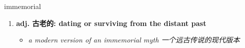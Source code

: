 
\begin{frame}
{\huge immemorial}
\begin{center}
\begin{enumerate}\Large
  \item \textbf{adj. 古老的: dating or surviving from the distant past}
  \begin{itemize}
    \item \em{\Large{a modern version of an immemorial myth 一个远古传说的现代版本}}
  \end{itemize}
\end{enumerate}
\end{center}
\end{frame}
